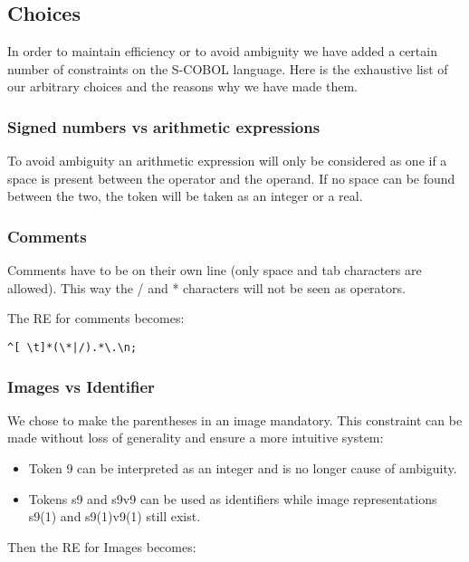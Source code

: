 \subsection{Choices}

In order to maintain efficiency or to avoid ambiguity we have added a certain number of constraints on the S-COBOL language. Here is the exhaustive list of our arbitrary choices and the reasons why we have made them.

\subsubsection{Signed numbers vs arithmetic expressions}

To avoid ambiguity an arithmetic expression will only be considered as one if a space is present between the operator and the operand. If no space can be found between the two, the token will be taken as an integer or a real.

\subsubsection{Comments}
\label{sec:impl:choices:comments}

Comments have to be on their own line (only space and tab characters are allowed). This way the / and * characters will not be seen as operators.

The RE for comments becomes:

\begin{verbatim}
^[ \t]*(\*|/).*\.\n;
\end{verbatim}

\subsubsection{Images vs Identifier}

We chose to make the parentheses in an image mandatory. This constraint can be made without loss of generality and ensure a more intuitive system:

\begin{itemize}
	\item Token 9 can be interpreted as an integer and is no longer cause of ambiguity.
	\item Tokens s9 and s9v9 can be used as identifiers while image representations s9(1) and s9(1)v9(1) still exist.  
\end{itemize}

Then the RE for Images becomes:

